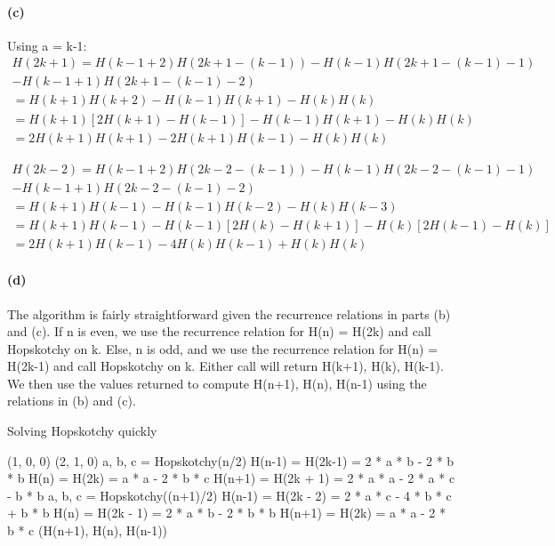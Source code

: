 \documentclass[11pt,a4paper]{article}
\begin{document}
\paragraph*{(c)}
Using a = k-1:
\begin{equation}
	\begin{aligned}
	H(2k+1) = H(k-1+2)H(2k+1-(k-1)) - H(k-1)H(2k+1-(k-1)-1) 
	\\- H(k-1+1)H(2k+1-(k-1)-2) 
	\\= H(k+1)H(k+2) - H(k-1)H(k+1) - H(k)H(k) 
	\\= H(k+1)[2H(k+1) - H(k-1)] - H(k-1)H(k+1) - H(k)H(k)
	\\= 2H(k+1)H(k+1) - 2H(k+1)H(k-1) - H(k)H(k)
 	\end{aligned}
\end{equation}

\begin{equation}
	\begin{aligned}
	H(2k-2) = H(k-1+2)H(2k-2-(k-1)) - H(k-1)H(2k-2-(k-1)-1) 
	\\- H(k-1+1)H(2k-2-(k-1)-2)
	\\= H(k+1)H(k-1) - H(k-1)H(k-2) - H(k)H(k-3)
	\\= H(k+1)H(k-1) -H(k-1)[2H(k) - H(k+1)] - H(k)[2H(k-1) - H(k)]
	\\=2H(k+1)H(k-1) - 4H(k)H(k-1) + H(k)H(k)
 	\end{aligned}
\end{equation}

\paragraph*{(d)}
The algorithm is fairly straightforward given the recurrence relations in parts (b) and (c). If n is even, we use the recurrence relation for H(n) = H(2k) and call Hopskotchy on k. Else, n is odd, and we use the recurrence relation for H(n) = H(2k-1) and call Hopskotchy on k. Either call will return H(k+1), H(k), H(k-1). We then use the values returned to compute H(n+1), H(n), H(n-1) using the relations in (b) and (c).

\begin{algorithm}
	\caption{Solving Hopskotchy quickly}
	\begin{algorithmic}[1]
	\State \Return (1, 0, 0)
	\EndIf
	\State \Return (2, 1, 0)
	\EndIf
	\State a, b, c = Hopskotchy(n/2)
	\State H(n-1) = H(2k-1) = 2 * a * b - 2 * b * b
	\State H(n) = H(2k) = a * a - 2 * b * c
	\State H(n+1) = H(2k + 1) = 2 * a * a - 2 * a * c - b * b
	\Else
	\State a, b, c = Hopskotchy((n+1)/2)
	\State H(n-1) = H(2k - 2) = 2 * a * c - 4 * b * c + b * b
	\State H(n) = H(2k - 1) = 2 * a * b - 2 * b * b
	\State H(n+1) = H(2k) = a * a - 2 * b * c
	\EndIf
	\State \Return (H(n+1), H(n), H(n-1))
	\EndFunction
	\end{algorithmic}
	\end{algorithm}
	
\end{document}
